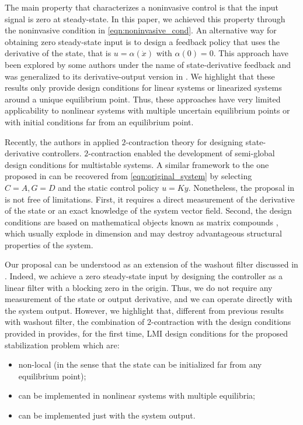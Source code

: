 \documentclass{ifacconf}
\begin{document}
The main property that characterizes a noninvasive control is that the input signal is zero at steady-state. In this paper, we achieved this property through the noninvasive condition in \eqref{eqn:noninvasive_cond}. An alternative way for obtaining zero steady-state input is to design a feedback policy that uses the derivative of the state, that is $u = \alpha(\dot x)$ with $\alpha(0)=0$. This approach have been explored by some authors under the name of state-derivative feedback \citep{ZAHEER2021109495,Arthur2019} and was generalized to its derivative-output version in \citep{ZAHEER2021109495,ARTHUR202040}. We highlight that these results only provide design conditions for linear systems or linearized systems around a unique equilibrium point. Thus, these approaches have very limited applicability to nonlinear systems with multiple uncertain equilibrium points or with initial conditions far from an equilibrium point. 

Recently, the authors in \citep{ANGELI2024152} applied $2$-contraction theory for designing state-derivative controllers. $2$-contraction enabled the development of semi-global design conditions for multistable systems. A similar framework to the one proposed in \citep{ANGELI2024152} can be recovered from \eqref{eqn:original_system} by selecting $C=A, G=D$ and the static control policy $u=Ky$. Nonetheless, the proposal in \citep{ANGELI2024152} is not free of limitations. First, it requires a direct measurement of the derivative of the state or an exact knowledge of the system vector field. Second, the design conditions are based on mathematical objects known as matrix compounds \citep{bar2023compound}, which usually explode in dimension and may destroy advantageous structural properties of the system. 

Our proposal can be understood as an extension of the washout filter discussed in \citep{GARRARD1977497, WANG19951213, Hassouneh2004}. Indeed, we achieve a zero steady-state input by designing the controller as a linear filter with a blocking zero in the origin. Thus, we do not require any measurement of the state or output derivative, and we can operate directly with the system output. However, we highlight that, different from previous results with washout filter, the combination of $2$-contraction \citep{cecilia2023generalized} with the design conditions provided in \citep{zoboli2024dynamic} provides, for the first time, LMI design conditions for the proposed stabilization problem which are:
\begin{itemize}
    \item non-local (in the sense that the state can be initialized far from any equilibrium point);
    \item can be implemented in nonlinear systems with multiple equilibria;
    \item can be implemented just with the system output.
\end{itemize}
\end{document}
